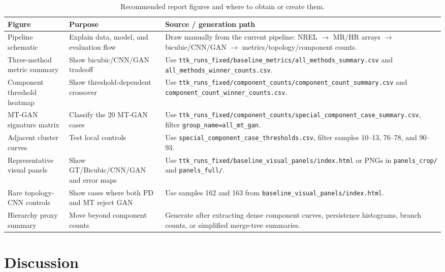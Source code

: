 \documentclass[conference]{IEEEtran}
\begin{document}
\begin{table}[t]
\centering
\caption{Recommended report figures and where to obtain or create them.}
\label{tab:figure_checklist}
\begin{tabularx}{\textwidth}{p{}p{}p{}}
\toprule
Figure & Purpose & Source / generation path \\
\midrule
Pipeline schematic & Explain data, model, and evaluation flow & Draw manually from the current pipeline: NREL $\rightarrow$ MR/HR arrays $\rightarrow$ bicubic/CNN/GAN $\rightarrow$ metrics/topology/component counts. \\
Three-method metric summary & Show bicubic/CNN/GAN tradeoff & Use \texttt{ttk\_runs\_fixed/baseline\_metrics/all\_methods\_summary.csv} and \texttt{all\_methods\_winner\_counts.csv}. \\
Component threshold heatmap & Show threshold-dependent crossover & Use \texttt{ttk\_runs\_fixed/component\_counts/component\_count\_summary.csv} and \texttt{component\_count\_winner\_counts.csv}. \\
MT-GAN signature matrix & Classify the 20 MT-GAN cases & Use \texttt{ttk\_runs\_fixed/component\_counts/special\_component\_case\_summary.csv}, filter \texttt{group\_name=all\_mt\_gan}. \\
Adjacent cluster curves & Test local controls & Use \texttt{special\_component\_case\_thresholds.csv}, filter samples 10--13, 76--78, and 90--93. \\
Representative visual panels & Show GT/Bicubic/CNN/GAN and error maps & Use \texttt{ttk\_runs\_fixed/baseline\_visual\_panels/index.html} or PNGs in \texttt{panels\_crop/} and \texttt{panels\_full/}. \\
Rare topology-CNN controls & Show cases where both PD and MT reject GAN & Use samples 162 and 163 from \texttt{baseline\_visual\_panels/index.html}. \\
Hierarchy proxy summary & Move beyond component counts & Generate after extracting dense component curves, persistence histograms, branch counts, or simplified merge-tree summaries. \\
\bottomrule
\end{tabularx}
\end{table}

\section{Discussion}
\end{document}
